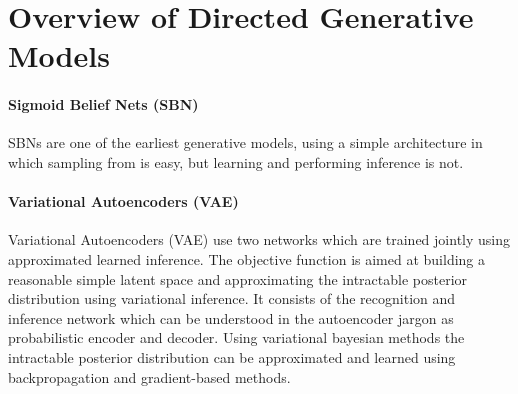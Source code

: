 \section{Overview of Directed Generative Models}
\label{sec:overview}

\paragraph{Sigmoid Belief Nets (SBN)}
\label{par:overview_sbn}
SBNs are one of the earliest generative models, using a simple architecture in which sampling from is easy, but learning and performing inference is not.

\paragraph{Variational Autoencoders (VAE) \cite{vae:2013}\cite{rezende:2014}}
\label{par:overview_vae}
Variational Autoencoders (VAE) use two networks which are trained jointly using approximated learned inference.
The objective function is aimed at building a reasonable simple latent space and approximating the intractable posterior distribution using variational inference.
It consists of the recognition and inference network which can be understood in the autoencoder jargon as probabilistic encoder and decoder.
Using variational bayesian methods the intractable posterior distribution can be approximated and learned using backpropagation and gradient-based methods.








